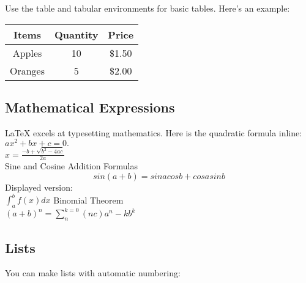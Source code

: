\documentclass{article}
\begin{document}
	Use the table and tabular environments for basic tables. Here’s an example:


\newpage
	
	\begin{tabular}{c|c|c}
		\textbf{Items}&\textbf{Quantity}&\textbf{Price}\\
		\hline
		Apples&10&$\$$1.50\\
		\hline
		Oranges&5&$\$$2.00\\
	\end{tabular}
	
	

\subsection{Mathematical Expressions}
LaTeX excels at typesetting mathematics. Here is the quadratic formula inline: $ ax^2 + bx + c = 0. $
\\

\begin{math}
x=\frac{-b+\sqrt{b^2-4ac}}{2a}
\end{math}
\\
Sine and Cosine Addition Formulas
\begin{equation}
sin(a + b) = sin a cos b + cos a sin b
\end{equation}
\begin{equation}
\end{equation}
Displayed version:
\\
\centering
\begin{math}
\int_{a}^{b}f(x)dx
\end{math}
Binomial Theorem
\\
\begin{math}
(a+b)^n=\sum_{n}^{k=0}(nc)a^n-kb^k
\end{math}



\subsection{Lists}
You can make lists with automatic numbering:
\end{document}
